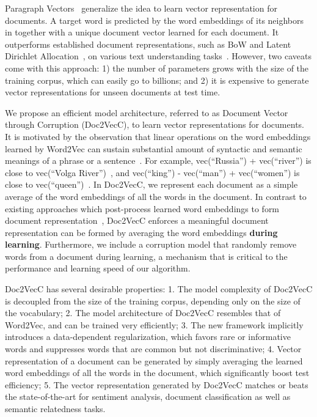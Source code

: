 \documentclass{article} \usepackage{iclr2017_conference,times}
\newcommand{\name}{Doc2VecC}
\begin{document}
Paragraph Vectors~\citep{le2014distributed} generalize the idea to learn vector representation for documents. A target word is predicted by the word embeddings of its neighbors in together with a unique document vector learned for each document. It outperforms established document representations, such as BoW and Latent Dirichlet Allocation~\citep{blei2003latent}, on various text understanding tasks~\citep{dai2015document}. However, two caveats come with this approach: 1) the number of parameters grows with the size of the training corpus, which can easily go to billions; 
 and 2) it is expensive to generate vector representations for unseen documents at test time. 


We propose an efficient model architecture, referred to as Document Vector through Corruption (\name{}), to learn vector representations for documents. It is motivated by the observation that linear operations on the word embeddings learned by Word2Vec can sustain substantial amount of syntactic and semantic meanings of a phrase or a sentence~\citep{mikolov2013linguistic}. For example, vec(``Russia'') + vec(``river'') is
close to vec(``Volga River'')~\citep{mikolov2013distributed}, and vec(``king'') - vec(``man'') + vec(``women'') is close to vec(``queen'')~\citep{mikolov2013linguistic}. In \name{}, we represent each document as a simple average of the word embeddings of all the words in the document. In contrast to  existing approaches which post-process learned word embeddings to form document representation~\citep{socher2013recursive,mesnil2014ensemble}, \name{} enforces a meaningful document representation can be formed by averaging the word embeddings \textbf{during learning}. Furthermore, we include a corruption model that randomly remove words from a document during learning, a mechanism that is critical to the performance and learning speed of our algorithm. 


\name{} has several desirable properties: 1. The model complexity of \name{} is decoupled from the size of the training corpus, depending only on the size of the vocabulary; 2. The model architecture of \name{} resembles that of Word2Vec, and can be trained very efficiently; 3. The new framework implicitly introduces a data-dependent regularization, which favors rare or informative words and suppresses words that are common but not discriminative; 4. Vector representation of a document can be generated by simply averaging the learned word embeddings of all the words in the document, which significantly boost test efficiency; 5. The vector representation generated by \name{} matches or beats the state-of-the-art for sentiment analysis, document classification as well as semantic relatedness tasks. 
\end{document}
